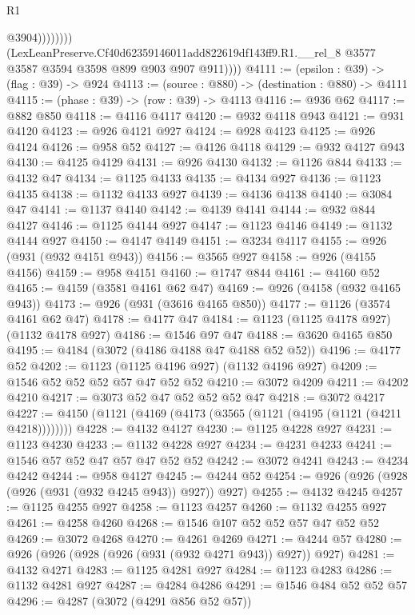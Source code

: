 \begin{lexlean}{R1}
\begin{coremodule}
                          @3904))))))))
          (LexLeanPreserve.Cf40d62359146011add822619df143ff9.R1.__rel_8
            @3577
            @3587
            @3594
            @3598
            @899
            @903
            @907
            @911))))
@4111 := (epsilon : @39) -> (flag : @39) -> @924
@4113 := (source : @880) -> (destination : @880) -> @4111
@4115 := (phase : @39) -> (row : @39) -> @4113
@4116 := @936 @62
@4117 := @882 @850
@4118 := @4116 @4117
@4120 := @932 @4118 @943
@4121 := @931 @4120
@4123 := @926 @4121 @927
@4124 := @928 @4123
@4125 := @926 @4124
@4126 := @958 @52
@4127 := @4126 @4118
@4129 := @932 @4127 @943
@4130 := @4125 @4129
@4131 := @926 @4130
@4132 := @1126 @844
@4133 := @4132 @47
@4134 := @1125 @4133
@4135 := @4134 @927
@4136 := @1123 @4135
@4138 := @1132 @4133 @927
@4139 := @4136 @4138
@4140 := @3084 @47
@4141 := @1137 @4140
@4142 := @4139 @4141
@4144 := @932 @844 @4127
@4146 := @1125 @4144 @927
@4147 := @1123 @4146
@4149 := @1132 @4144 @927
@4150 := @4147 @4149
@4151 := @3234 @4117
@4155 := @926 (@931 (@932 @4151 @943))
@4156 := @3565 @927
@4158 := @926 (@4155 @4156)
@4159 := @958 @4151
@4160 := @1747 @844
@4161 := @4160 @52
@4165 := @4159 (@3581 @4161 @62 @47)
@4169 := @926 (@4158 (@932 @4165 @943))
@4173 := @926 (@931 (@3616 @4165 @850))
@4177 := @1126 (@3574 @4161 @62 @47)
@4178 := @4177 @47
@4184 := @1123 (@1125 @4178 @927) (@1132 @4178 @927)
@4186 := @1546 @97 @47
@4188 := @3620 @4165 @850
@4195 := @4184 (@3072 (@4186 @4188 @47 @4188 @52 @52))
@4196 := @4177 @52
@4202 := @1123 (@1125 @4196 @927) (@1132 @4196 @927)
@4209 := @1546 @52 @52 @52 @57 @47 @52 @52
@4210 := @3072 @4209
@4211 := @4202 @4210
@4217 := @3073 @52 @47 @52 @52 @52 @47
@4218 := @3072 @4217
@4227 := @4150 (@1121 (@4169 (@4173 (@3565 (@1121 (@4195 (@1121 (@4211 @4218))))))))
@4228 := @4132 @4127
@4230 := @1125 @4228 @927
@4231 := @1123 @4230
@4233 := @1132 @4228 @927
@4234 := @4231 @4233
@4241 := @1546 @57 @52 @47 @57 @47 @52 @52
@4242 := @3072 @4241
@4243 := @4234 @4242
@4244 := @958 @4127
@4245 := @4244 @52
@4254 := @926 (@926 (@928 (@926 (@931 (@932 @4245 @943)) @927)) @927)
@4255 := @4132 @4245
@4257 := @1125 @4255 @927
@4258 := @1123 @4257
@4260 := @1132 @4255 @927
@4261 := @4258 @4260
@4268 := @1546 @107 @52 @52 @57 @47 @52 @52
@4269 := @3072 @4268
@4270 := @4261 @4269
@4271 := @4244 @57
@4280 := @926 (@926 (@928 (@926 (@931 (@932 @4271 @943)) @927)) @927)
@4281 := @4132 @4271
@4283 := @1125 @4281 @927
@4284 := @1123 @4283
@4286 := @1132 @4281 @927
@4287 := @4284 @4286
@4291 := @1546 @484 @52 @52 @57
@4296 := @4287 (@3072 (@4291 @856 @52 @57))

\end{coremodule}
\end{lexlean}
